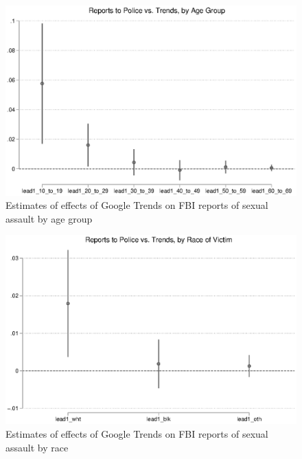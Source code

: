 \documentclass[AER,draftmode]{AEA}
\begin{document}
\begin{figure}
\includegraphics[width=\linewidth]{figures/police_trend_daily_agegroup.eps}
\caption{Estimates of effects of Google Trends on FBI reports of sexual assault by age group} \label{figure:police_trends_daily_by_age}
\end{figure}

\begin{figure}
\includegraphics[width=\linewidth]{figures/police_trend_daily_race.eps}
\caption{Estimates of effects of Google Trends on FBI reports of sexual assault by race} \label{figure:police_trends_daily_by_race}
\end{figure}
\end{document}
